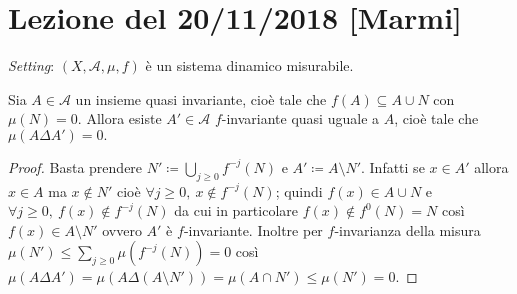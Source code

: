 \section{Lezione del 20/11/2018 [Marmi]}

\emph{Setting}: $ (X, \mathcal{A}, \mu, f) $ è un sistema dinamico misurabile.

\begin{lemma} \label{lem:insieme-quasi-invariante}
    Sia $ A \in \mathcal{A} $ un insieme quasi invariante, cioè tale che $ f(A) \subseteq A \cup N $ con $ \mu(N) = 0 $. Allora esiste $ A' \in \mathcal{A} $ $ f $-invariante quasi uguale a $ A $, cioè tale che $ \mu(A \Delta A') = 0. $
\end{lemma}
\begin{proof}
    Basta prendere $ N' \coloneqq \bigcup_{j \geq 0} f^{-j}(N) $ e $ A' \coloneqq A \setminus N' $. Infatti se $ x \in A' $ allora $ x \in A $ ma $ x \notin N' $ cioè $ \forall j \geq 0, \ x \notin f^{-j}(N) $; quindi $ f(x) \in A \cup N $ e $ \forall j \geq 0, \ f(x) \notin f^{-j}(N) $ da cui in particolare $ f(x) \notin f^0(N) = N $ così $ f(x) \in A \setminus N' $ ovvero $ A' $ è $ f $-invariante. Inoltre per $ f $-invarianza della misura $ \mu(N') \leq \sum_{j \geq 0} \mu(f^{-j}(N)) = 0 $ così $ \mu(A\Delta A') = \mu(A\Delta(A\setminus N')) = \mu(A \cap N') \leq \mu(N') = 0 $.
\end{proof}

